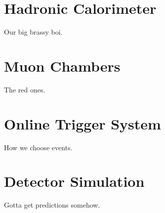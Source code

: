 \section{Hadronic Calorimeter}

Our big brassy boi.

\section{Muon Chambers}

The red ones.

\section{Online Trigger System}

How we choose events.

\section{Detector Simulation}

Gotta get predictions somehow.




